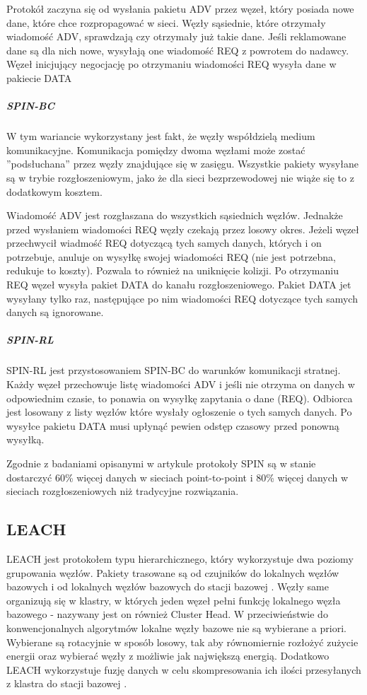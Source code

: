 Protokół zaczyna się od wysłania pakietu ADV przez węzeł, który posiada nowe dane, które chce rozpropagować w sieci. Węzły sąsiednie, które otrzymały wiadomość ADV, sprawdzają czy otrzymały już takie dane. Jeśli reklamowane dane są dla nich nowe, wysyłają one wiadomość REQ z powrotem do nadawcy. Węzeł inicjujący negocjację po otrzymaniu wiadomości REQ wysyła dane w pakiecie DATA

\subparagraph{SPIN-BC}
W tym wariancie wykorzystany jest fakt, że węzły współdzielą medium komunikacyjne. Komunikacja pomiędzy dwoma węzłami może zostać ''podsłuchana'' przez węzły znajdujące się w zasięgu. Wszystkie pakiety wysyłane są w trybie rozgłoszeniowym, jako że dla sieci bezprzewodowej nie wiąże się to z dodatkowym kosztem.

Wiadomość ADV jest rozgłaszana do wszystkich sąsiednich węzłów. Jednakże przed wysłaniem wiadomości REQ węzły czekają przez losowy okres. Jeżeli węzeł przechwycił wiadmość REQ dotyczącą tych samych danych, których i on potrzebuje, anuluje on wysyłkę swojej wiadomości REQ (nie jest potrzebna, redukuje to koszty). Pozwala to również na uniknięcie kolizji. Po otrzymaniu REQ węzeł wysyła pakiet DATA do kanału rozgłoszeniowego. Pakiet DATA jet wysyłany tylko raz, następujące po nim wiadomości REQ dotyczące tych samych danych są ignorowane.
\subparagraph{SPIN-RL}
SPIN-RL jest przystosowaniem SPIN-BC do warunków komunikacji stratnej. Każdy węzeł przechowuje listę wiadomości ADV i jeśli nie otrzyma on danych w odpowiednim czasie, to ponawia on wysyłkę zapytania o dane (REQ). Odbiorca jest losowany z listy węzłów które wysłały ogłoszenie o tych samych danych.
Po wysyłce pakietu DATA musi upłynąć pewien odstęp czasowy przed ponowną wysyłką.

Zgodnie z badaniami opisanymi w artykule \cite{Kulik2002} protokoły SPIN są w stanie dostarczyć 60\% więcej danych w sieciach point-to-point i 80\% więcej danych w sieciach rozgłoszeniowych niż tradycyjne rozwiązania.  
\subsection{LEACH} \label{subsec:leach}
LEACH jest protokołem typu hierarchicznego, który wykorzystuje dwa poziomy grupowania węzłów. Pakiety trasowane są od czujników do lokalnych węzłów bazowych i od lokalnych węzłów bazowych do stacji bazowej \cite{Yu2006}.
Węzły same organizują się w klastry, w których jeden węzeł pełni funkcję lokalnego węzła bazowego - nazywany jest on również Cluster Head. W przeciwieństwie do konwencjonalnych algorytmów lokalne węzły bazowe nie są wybierane a priori. Wybierane są rotacyjnie w sposób losowy, tak aby równomiernie rozłożyć zużycie energii oraz wybierać węzły z możliwie jak największą energią. Dodatkowo LEACH wykorzystuje fuzję danych w celu skompresowania ich ilości przesyłanych z klastra do stacji bazowej \cite{Akkaya2005, Heinzelman00}.

